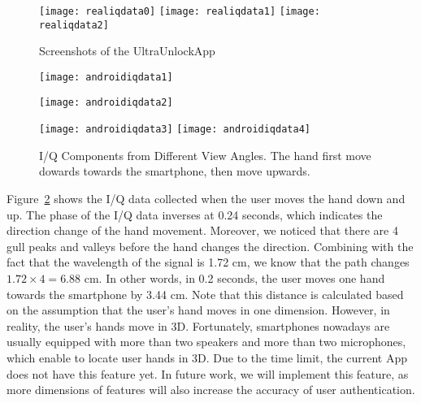 \begin{figure}[h]
	\centering
	\begin{minipage}{.6\linewidth}
		\texttt{[image: realiqdata0]}
		\vspace{.1in}
		\texttt{[image: realiqdata1]}
		\vspace{.1in}
		\texttt{[image: realiqdata2]}
	\end{minipage}
	\caption{Screenshots of the UltraUnlockApp}	
	\label{fig:realIQ}
\end{figure}

\begin{figure}[!h]
	\centering
	\texttt{[image: androidiqdata1]}
	\begin{minipage}{.4\linewidth}
		\texttt{[image: androidiqdata2]}
	\end{minipage}
	\hfil
	\begin{minipage}{.5\linewidth}
		\texttt{[image: androidiqdata3]}
		\texttt{[image: androidiqdata4]}
	\end{minipage}
	\caption[I/Q Components Collected by UltraUnlockApp]{I/Q Components from Different View Angles. The hand first move dowards towards the smartphone, then move upwards.}
	\label{fig:androidiqdata}
\end{figure}

Figure~\ref{fig:androidiqdata} shows the I/Q data collected when the user moves the hand down and up. The phase of the I/Q data inverses at 0.24 seconds, which indicates the direction change of the hand movement. Moreover, we noticed that there are 4 gull peaks and valleys before the hand changes the direction. Combining with the fact that the wavelength of the signal is 1.72 cm, we know that the path changes $1.72 \times 4 = 6.88$ cm. In other words, in 0.2 seconds, the user moves one hand towards the smartphone by 3.44 cm. Note that this distance is calculated based on the assumption that the user's hand moves in one dimension. However, in reality, the user's hands move in 3D. Fortunately, smartphones nowadays are usually equipped with more than two speakers and more than two microphones, which enable {\uu} to locate user hands in 3D. Due to the time limit, the current {\uu}App does not have this feature yet. In future work, we will implement this feature, as more dimensions of features will also increase the accuracy of user authentication.

